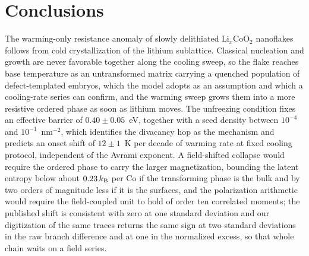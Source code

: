 \documentclass[reprint,twocolumn,prb,amsmath,amssymb,superscriptaddress,floatfix]{revtex4-2}
\newcommand{\kB}{k_{\mathrm{B}}}
\begin{document}
\section{Conclusions}
\label{sec:conclusions}

The warming-only resistance anomaly of slowly delithiated Li$_x$CoO$_2$ nanoflakes follows from
cold crystallization of the lithium sublattice. Classical nucleation and growth are never
favorable together along the cooling sweep, so the flake reaches base temperature as an
untransformed matrix carrying a quenched population of defect-templated embryos, which the
model adopts as an assumption and which a cooling-rate series can confirm, and the warming sweep
grows them into a more resistive ordered phase as soon as lithium moves. The unfreezing
condition fixes an effective barrier of $0.40\pm0.05$~eV, together with a seed density between
$10^{-4}$ and $10^{-1}$~nm$^{-2}$, which identifies the divacancy hop as the mechanism and
predicts an onset shift of $12\pm1$~K per decade of warming rate at fixed cooling protocol,
independent of the Avrami exponent. A field-shifted collapse would require the ordered phase to
carry the larger magnetization, bounding the latent entropy below about $\dSbound\,\kB$ per Co
if the transforming phase is the bulk and by two orders of magnitude less if it is the surfaces,
and the polarization arithmetic would require the field-coupled unit to hold of order ten
correlated moments; the published shift is consistent with zero at one standard deviation and
our digitization of the same traces returns the same sign at two standard deviations in the raw
branch difference and at one in the normalized excess, so that whole chain waits on a field
series.
\end{document}
